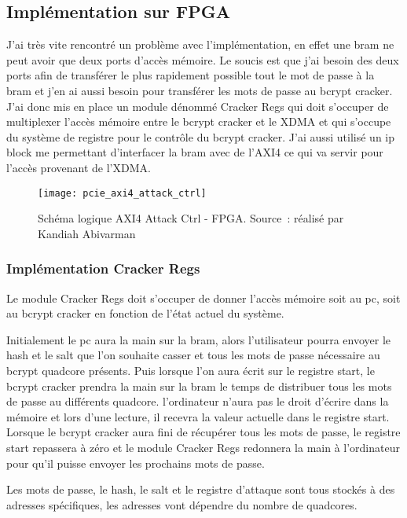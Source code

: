\subsection{Implémentation sur FPGA}

J'ai très vite rencontré un problème avec l'implémentation, en effet une \gls{bram} ne peut avoir que deux ports d'accès mémoire.
Le soucis est que j'ai besoin des deux ports afin de transférer le plus rapidement possible tout le mot de passe à la \gls{bram} et j'en ai aussi besoin pour transférer les mots de passe au bcrypt cracker. 
J'ai donc mis en place un module dénommé Cracker Regs qui doit s'occuper de multiplexer l'accès mémoire entre le bcrypt cracker et le XDMA et qui s'occupe du système de registre pour le contrôle du bcrypt cracker.
J'ai aussi utilisé un \gls{ip} block me permettant d'interfacer la \gls{bram} avec de l'AXI4 ce qui va servir pour l'accès provenant de l'XDMA.

\begin{figure}[tbph!]
	\centering
	\texttt{[image: pcie\_axi4\_attack\_ctrl]}
	\caption[Schéma logique AXI4 Attack Ctrl - FPGA]{Schéma logique AXI4 Attack Ctrl - FPGA. Source : réalisé par Kandiah Abivarman}
	\label{fig:pcie_axi4_attack_ctrl}
\end{figure}

\subsubsection{Implémentation Cracker Regs}

Le module Cracker Regs doit s'occuper de donner l'accès mémoire soit au \gls{pc}, soit au bcrypt cracker en fonction de l'état actuel du système.

Initialement le \gls{pc} aura la main sur la \gls{bram}, alors l'utilisateur pourra envoyer le hash et le salt que l'on souhaite casser et tous les mots de passe nécessaire au bcrypt quadcore présents.
Puis lorsque l'on aura écrit sur le registre start, le bcrypt cracker prendra la main sur la \gls{bram} le temps de distribuer tous les mots de passe au différents quadcore.
l'ordinateur n'aura pas le droit d'écrire dans la mémoire et lors d'une lecture, il recevra la valeur actuelle dans le registre start. 
Lorsque le bcrypt cracker aura fini de récupérer tous les mots de passe, le registre start repassera à zéro et le module Cracker Regs redonnera la main à l'ordinateur pour qu'il puisse envoyer les prochains mots de passe.

Les mots de passe, le hash, le salt et le registre d'attaque sont tous stockés à des adresses spécifiques, les adresses vont dépendre du nombre de quadcores.

